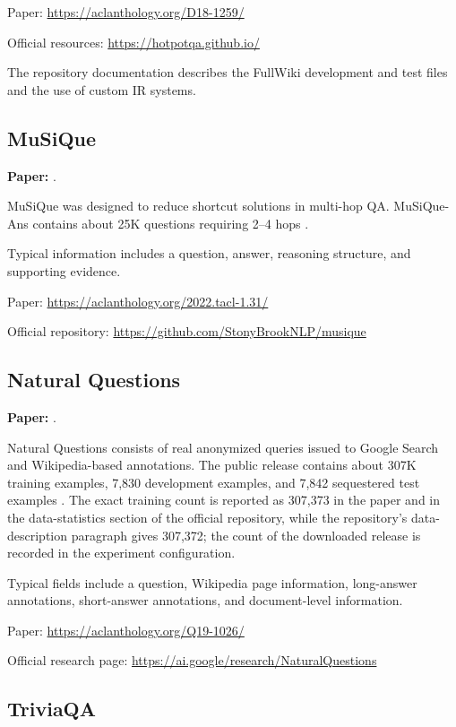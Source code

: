 \documentclass[11pt,a4paper]{article}
\begin{document}
Paper:
\url{https://aclanthology.org/D18-1259/}

Official resources:
\url{https://hotpotqa.github.io/}

The repository documentation describes the FullWiki development and test files and the use of custom IR systems.

\subsection{MuSiQue}

\textbf{Paper:} \citet{trivedi-etal-2022-musique}.

MuSiQue was designed to reduce shortcut solutions in multi-hop QA. MuSiQue-Ans contains about 25K questions requiring 2--4 hops \citep{trivedi-etal-2022-musique}.

Typical information includes a question, answer, reasoning structure, and supporting evidence.

Paper:
\url{https://aclanthology.org/2022.tacl-1.31/}

Official repository:
\url{https://github.com/StonyBrookNLP/musique}

\subsection{Natural Questions}

\textbf{Paper:} \citet{kwiatkowski-etal-2019-natural}.

Natural Questions consists of real anonymized queries issued to Google Search and Wikipedia-based annotations. The public release contains about 307K training examples, 7,830 development examples, and 7,842 sequestered test examples \citep{kwiatkowski-etal-2019-natural}. The exact training count is reported as 307,373 in the paper and in the data-statistics section of the official repository, while the repository's data-description paragraph gives 307,372; the count of the downloaded release is recorded in the experiment configuration.

Typical fields include a question, Wikipedia page information, long-answer annotations, short-answer annotations, and document-level information.

Paper:
\url{https://aclanthology.org/Q19-1026/}

Official research page:
\url{https://ai.google/research/NaturalQuestions}

\subsection{TriviaQA}
\end{document}
